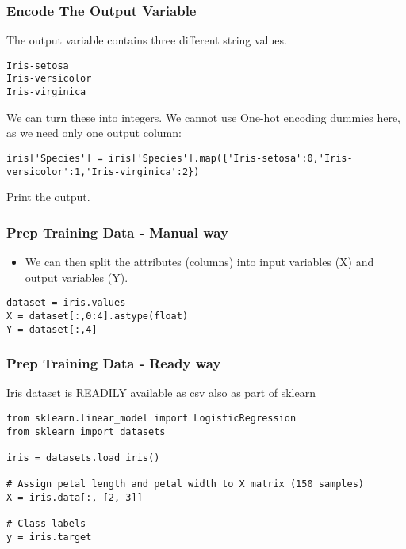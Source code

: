 \begin{frame}[fragile]\frametitle{Encode The Output Variable}
The output variable contains three different string values.
\begin{lstlisting}
Iris-setosa
Iris-versicolor
Iris-virginica
\end{lstlisting}

We can turn these into integers. We cannot use One-hot encoding dummies here, as we need only one output column:
\begin{lstlisting}
iris['Species'] = iris['Species'].map({'Iris-setosa':0,'Iris-versicolor':1,'Iris-virginica':2})
\end{lstlisting}


Print the output.
\end{frame}

\begin{frame}[fragile]\frametitle{Prep Training Data - Manual way}
\begin{itemize}
\item We can then split the attributes (columns) into input variables (X) and output variables (Y).
\end{itemize}
\begin{lstlisting}
dataset = iris.values
X = dataset[:,0:4].astype(float)
Y = dataset[:,4]
\end{lstlisting}
\end{frame}


\begin{frame}[fragile]\frametitle{Prep Training Data - Ready way}
Iris dataset is READILY available as csv also as part of sklearn
\begin{lstlisting}
from sklearn.linear_model import LogisticRegression
from sklearn import datasets

iris = datasets.load_iris()

# Assign petal length and petal width to X matrix (150 samples)
X = iris.data[:, [2, 3]]

# Class labels
y = iris.target
\end{lstlisting}

\end{frame}

